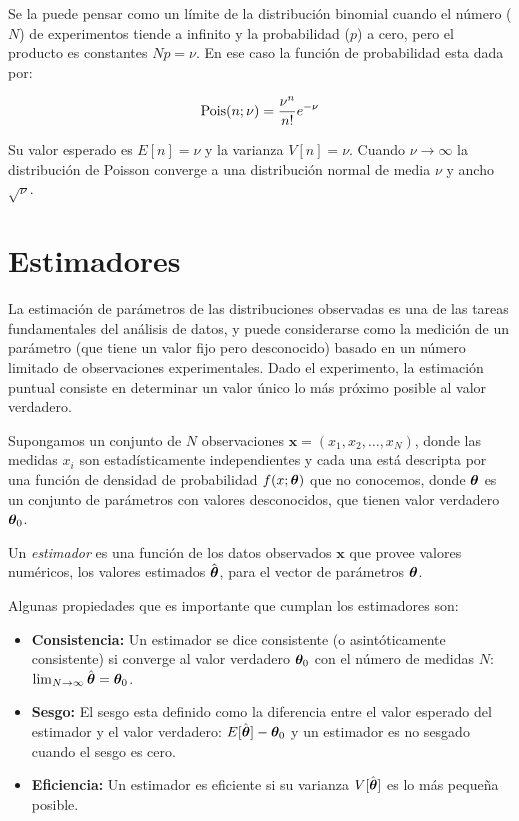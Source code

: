 Se la puede pensar como un límite de la distribución binomial cuando el número ($N$)
de experimentos tiende a infinito y la probabilidad ($p$) a cero, pero el producto es
constantes $Np = \nu$. En ese caso la función de probabilidad esta dada por:

\begin{equation}
  \operatorname{Pois}(n;\nu) = \frac{\nu^n}{n!} e^{-\nu}
\end{equation}

Su valor esperado es $E[n] = \nu$ y la varianza $V[n] = \nu$.
Cuando $\nu \to \infty$ la distribución de Poisson converge a una distribución
normal de media $\nu$ y ancho $\sqrt{\nu}$.


\section{Estimadores}

La estimación de parámetros de las distribuciones observadas es una de las
tareas fundamentales del análisis de datos, y puede considerarse como la
medición de un parámetro (que tiene un valor fijo pero desconocido) basado en un
número limitado de observaciones experimentales. Dado el experimento, la
estimación puntual consiste en determinar un valor único lo más próximo posible al
valor verdadero.

Supongamos un conjunto de $N$ observaciones $\bm{x} = (x_1, x_2, \ldots, x_N)$,
donde las medidas $x_i$ son estadísticamente independientes y cada una está
descripta por una función de densidad de probabilidad $f(x;\bm{\theta})$ que no
conocemos, donde $\bm{\theta}$ es un conjunto de parámetros con valores
desconocidos, que tienen valor verdadero $\bm{\theta}_0$.

Un \emph{estimador} es una función de los datos observados $\bm{x}$ que provee
valores numéricos, los valores estimados $\hat{\bm{\theta}}$, para el vector de
parámetros $\bm{\theta}$.

Algunas propiedades que es importante que cumplan los estimadores son:

\begin{itemize}\itemsep0.2cm\parskip0.2cm
\item {\bf Consistencia:} Un estimador se dice consistente (o asintóticamente
  consistente) si converge al valor verdadero $\bm{\theta}_{0}$ con el número de
  medidas $N$: $\lim_{N \rightarrow \infty} \hat{\bm{\theta}} = \bm{\theta}_0$.

\item {\bf Sesgo:} El sesgo esta definido como la diferencia entre el valor
  esperado del estimador y el valor verdadero: $E[\hat{\bm{\theta}}] - \bm{\theta}_0$ y
  un estimador es no sesgado cuando el sesgo es cero.

\item {\bf Eficiencia:} Un estimador es eficiente si su varianza
  $V[\hat{\bm{\theta}}]$ es lo más peque\~na posible.
\end{itemize}

